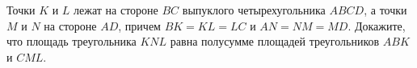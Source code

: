 \begin{ex}
	\begin{condition}
		Точки \( K  \) и \( L  \) лежат на стороне \( BC  \) выпуклого четырехугольника \( ABCD \), а точки \( M  \) и \( N  \) на стороне \( AD \), причем \( BK = KL = LC  \) и \( AN = NM = MD \). Докажите, что площадь треугольника \( KNL  \) равна полусумме площадей треугольников \( ABK  \) и \( CML \).
	\end{condition}
\end{ex}